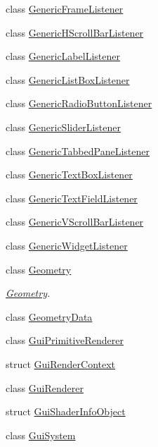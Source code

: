 \begin{DoxyCompactItemize}
class \mbox{\hyperlink{classec_1_1_generic_frame_listener}{Generic\+Frame\+Listener}}
\item 
class \mbox{\hyperlink{classec_1_1_generic_h_scroll_bar_listener}{Generic\+H\+Scroll\+Bar\+Listener}}
\item 
class \mbox{\hyperlink{classec_1_1_generic_label_listener}{Generic\+Label\+Listener}}
\item 
class \mbox{\hyperlink{classec_1_1_generic_list_box_listener}{Generic\+List\+Box\+Listener}}
\item 
class \mbox{\hyperlink{classec_1_1_generic_radio_button_listener}{Generic\+Radio\+Button\+Listener}}
\item 
class \mbox{\hyperlink{classec_1_1_generic_slider_listener}{Generic\+Slider\+Listener}}
\item 
class \mbox{\hyperlink{classec_1_1_generic_tabbed_pane_listener}{Generic\+Tabbed\+Pane\+Listener}}
\item 
class \mbox{\hyperlink{classec_1_1_generic_text_box_listener}{Generic\+Text\+Box\+Listener}}
\item 
class \mbox{\hyperlink{classec_1_1_generic_text_field_listener}{Generic\+Text\+Field\+Listener}}
\item 
class \mbox{\hyperlink{classec_1_1_generic_v_scroll_bar_listener}{Generic\+V\+Scroll\+Bar\+Listener}}
\item 
class \mbox{\hyperlink{classec_1_1_generic_widget_listener}{Generic\+Widget\+Listener}}
\item 
class \mbox{\hyperlink{classec_1_1_geometry}{Geometry}}
\begin{DoxyCompactList}\small\item\em \mbox{\hyperlink{classec_1_1_geometry}{Geometry}}. \end{DoxyCompactList}\item 
class \mbox{\hyperlink{classec_1_1_geometry_data}{Geometry\+Data}}
\item 
class \mbox{\hyperlink{classec_1_1_gui_primitive_renderer}{Gui\+Primitive\+Renderer}}
\item 
struct \mbox{\hyperlink{structec_1_1_gui_render_context}{Gui\+Render\+Context}}
\item 
class \mbox{\hyperlink{classec_1_1_gui_renderer}{Gui\+Renderer}}
\item 
struct \mbox{\hyperlink{structec_1_1_gui_shader_info_object}{Gui\+Shader\+Info\+Object}}
\item 
class \mbox{\hyperlink{classec_1_1_gui_system}{Gui\+System}}
\item 

\end{DoxyCompactItemize}

